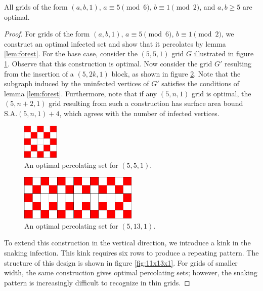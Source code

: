 \begin{con}
\label{con:snake}
All grids of the form $(a,b,1)$, $a \equiv 5 \pmod 6$, $b \equiv 1 \pmod 2$, and $a,b \geq 5$ are optimal.
\end{con}

\begin{proof}
For grids of the form $(a,b,1)$, $a \equiv 5 \pmod 6$, $b \equiv 1 \pmod 2$, we construct an optimal infected set and show that it percolates by lemma \ref{lem:forest}. For the base case, consider the $(5,5,1)$ grid $G$ illustrated in figure \ref{fig:5x5x1}. Observe that this construction is optimal. Now consider the grid $G'$ resulting from the insertion of a $(5, 2k, 1)$ block, as shown in figure \ref{fig:5x13x1}. Note that the subgraph induced by the uninfected vertices of $G'$ satisfies the conditions of lemma \ref{lem:forest}. Furthermore, note that if any $(5, n, 1)$ grid is optimal, the $(5,n+2,1)$ grid resulting from such a construction has surface area bound $\text{S.A.}(5,n,1) + 4$, which agrees with the number of infected vertices.

\begin{figure}[]
\centering
\includegraphics[width=0.15\textwidth]{figures/7/5x5x1.pdf}
\caption{An optimal percolating set for $(5,5,1)$.}
\label{fig:5x5x1}
\end{figure} 

\begin{figure}[]
\centering
\includegraphics[width=0.5\textwidth]{figures/7/5x13x1.pdf}
\caption{An optimal percolating set for $(5,13,1)$.}
\label{fig:5x13x1}
\end{figure} 

To extend this construction in the vertical direction, we introduce a kink in the snaking infection. This kink requires six rows to produce a repeating pattern. The structure of this design is shown in figure \ref{fig:11x13x1}. For grids of smaller width, the same construction gives optimal percolating sets; however, the snaking pattern is increasingly difficult to recognize in thin grids.
\end{proof}

